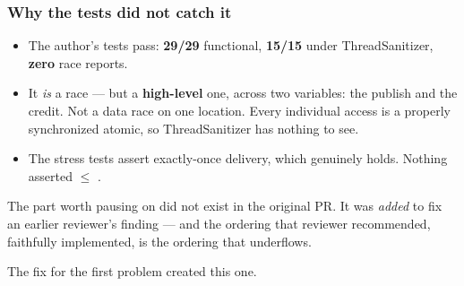 \begin{frame}
  \frametitle{Why the tests did not catch it} \small

\begin{itemize}
\item The author's tests pass: {\bf 29/29} functional, {\bf 15/15} under
      ThreadSanitizer, {\bf zero} race reports.
\item It {\em is} a race --- but a {\bf high-level} one, across two variables:
      the publish and the credit. Not a data race on one location. Every
      individual access is a properly synchronized atomic, so ThreadSanitizer
      has nothing to see.
\item The stress tests assert exactly-once delivery, which genuinely holds.
      Nothing asserted  $\leq$ .
\end{itemize}

\pause
\vspace{0.3cm}

\begin{block}{The part worth pausing on}\small
{} did not exist in the original PR. It was {\em added} to fix an
earlier reviewer's finding --- and the ordering that reviewer recommended,
faithfully implemented, is the ordering that underflows.

\vspace{0.15cm}

The fix for the first problem created this one.
\end{block}

\end{frame}
